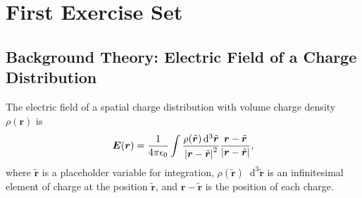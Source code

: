 \documentclass[11pt, a4paper]{article}
\newcommand{\diff}{\mathop{}\!\mathrm{d}} %
\renewcommand{\vec}[1]{\bm{#1}} %
\newcommand{\tvec}[1]{\tilde{\vec{#1}}} %
\renewcommand{\r}{\vec{r}}
\newcommand{\ee}{\epsilon_{0}}  %
\begin{document}
\newpage

\tableofcontents

\newpage


\section{First Exercise Set}

\subsection{Background Theory: Electric Field of a Charge Distribution}
The electric field of a spatial charge distribution with volume charge density $ \rho(\r) $ is
\begin{equation*}
	\vec{E}(\vec{r}) = \frac{1}{4\pi \ee}\int \frac{\rho(\tvec{r}) \diff^{3}\tvec{r} }{\abs{\vec{r} - \tvec{r}}^{2}} \frac{\vec{r} - \tvec{r}}{\abs{\vec{r} - \tvec{r}}},
\end{equation*}
where $ \tvec{r} $ is a placeholder variable for integration, $ \rho(\tvec{r}) \diff^{3}\tvec{r} $ is an infinitesimal element of charge at the position $ \tvec{r} $, and $ \vec{r} - \tvec{r} $ is the position of each charge.
\end{document}
